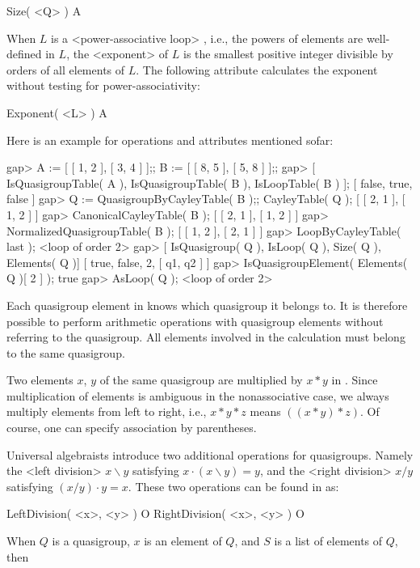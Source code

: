 \>Size( <Q> ) A

When $L$ is a <power-associative loop>
%
%
, i.e., the powers of elements are well-defined in $L$, the <exponent>
%
%
 of $L$ is the smallest positive
integer divisible by orders of all elements of $L$. The following attribute
calculates the exponent without testing for power-associativity:

\>Exponent( <L> ) A

Here is an example for operations and attributes mentioned sofar:

\beginexample
gap> A := [ [ 1, 2 ], [ 3, 4 ] ];; B := [ [ 8, 5 ], [ 5, 8 ] ];;
gap> [ IsQuasigroupTable( A ), IsQuasigroupTable( B ), IsLoopTable( B ) ];
[ false, true, false ]
gap> Q := QuasigroupByCayleyTable( B );; CayleyTable( Q );
[ [ 2, 1 ], [ 1, 2 ] ]
gap> CanonicalCayleyTable( B );
[ [ 2, 1 ], [ 1, 2 ] ]
gap> NormalizedQuasigroupTable( B );
[ [ 1, 2 ], [ 2, 1 ] ]
gap> LoopByCayleyTable( last );
<loop of order 2>
gap> [ IsQuasigroup( Q ), IsLoop( Q ), Size( Q ), Elements( Q )]
[ true, false, 2, [ q1, q2 ] ]
gap> IsQuasigroupElement( Elements( Q )[ 2 ] );
true
gap> AsLoop( Q );
<loop of order 2>
\endexample


Each quasigroup element in {\GAP} knows which quasigroup it belongs to. It is
therefore possible to perform arithmetic operations with quasigroup elements
without referring to the quasigroup. All elements involved in the calculation
must belong to the same quasigroup.

Two elements $x$, $y$ of the same quasigroup are multiplied by $x*y$ in {\GAP}.
Since multiplication of elements is ambiguous in the nonassociative case, we
always multiply elements from left to right, i.e., $x*y*z$ means $((x*y)*z)$.
Of course, one can specify association by parentheses.

Universal algebraists introduce two additional operations for quasigroups.
Namely the <left division>
%
%
 $x\backslash y$ satisfying $x\cdot(x\backslash
y)=y$, and the <right division>
%
%
 $x/y$ satisfying $(x/y)\cdot y=x$. These
two operations can be found in {\LOOPS} as:

\>LeftDivision( <x>, <y> ) O
\>RightDivision( <x>, <y> ) O

When $Q$ is a quasigroup, $x$ is an element of $Q$, and $S$ is a list of
elements of $Q$, then

